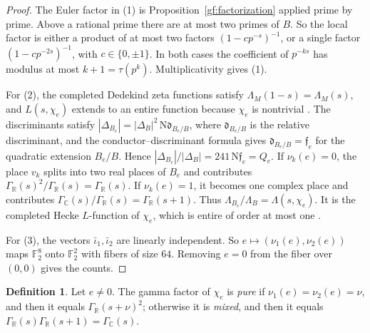 \documentclass[11pt]{amsart}
\numberwithin{equation}{section}
\theoremstyle{definition}
\newtheorem{definition}[equation]{Definition}
\theoremstyle{remark}
\newcommand{\Ftwo}{\mathbb F_2}
\newcommand{\R}{\mathbb R}
\newcommand{\C}{\mathbb C}
\begin{document}
\begin{proof}
The Euler factor in (1) is Proposition~\ref{gf:factorization} applied prime
by prime. Above a rational prime there are at most two primes of $B$. So
the local factor is either a product of at most two factors
$(1-cp^{-s})^{-1}$, or a single factor $(1-cp^{-2s})^{-1}$, with
$c\in\{0,\pm1\}$. In both cases the coefficient of $p^{-ks}$ has modulus at
most $k+1=\tau(p^k)$. Multiplicativity gives (1).

For (2), the completed Dedekind zeta functions satisfy
$\Lambda_M(1-s)=\Lambda_M(s)$, and $L(s,\chi_e)$ extends to an entire
function because $\chi_e$ is nontrivial \cite{Hecke1920,Tate1967}. The
discriminants satisfy
$|\Delta_{B_e}|=|\Delta_B|^2\,\mathrm N\mathfrak d_{B_e/B}$, where
$\mathfrak d_{B_e/B}$ is the relative discriminant, and the
conductor--discriminant formula gives $\mathfrak d_{B_e/B}=\mathfrak f_e$
for the quadratic extension $B_e/B$. Hence
$|\Delta_{B_e}|/|\Delta_B|=241\,\mathrm N\mathfrak f_e=Q_e$. If $\nu_k(e)=0$,
the place $v_k$ splits into two real places of $B_e$ and contributes
$\Gamma_\R(s)^2/\Gamma_\R(s)=\Gamma_\R(s)$. If $\nu_k(e)=1$, it becomes one
complex place and contributes $\Gamma_\C(s)/\Gamma_\R(s)=\Gamma_\R(s+1)$.
Thus $\Lambda_{B_e}/\Lambda_B=\Lambda(s,\chi_e)$. It is the completed Hecke
$L$-function of $\chi_e$, which is entire of order at most one
\cite{Hecke1920,Tate1967}.

For (3), the vectors $\bar\iota_1,\bar\iota_2$ are linearly independent. So
$e\mapsto(\nu_1(e),\nu_2(e))$ maps $\Ftwo^8$ onto $\Ftwo^2$ with fibers of
size $64$. Removing $e=0$ from the fiber over $(0,0)$ gives the counts.
\end{proof}

\begin{definition}\label{gf:pure-mixed}
Let $e\ne0$. The gamma factor of $\chi_e$ is \emph{pure} if
$\nu_1(e)=\nu_2(e)=\nu$, and then it equals $\Gamma_\R(s+\nu)^2$; otherwise it
is \emph{mixed}, and then it equals $\Gamma_\R(s)\Gamma_\R(s+1)=\Gamma_\C(s)$.
\end{definition}
\end{document}
